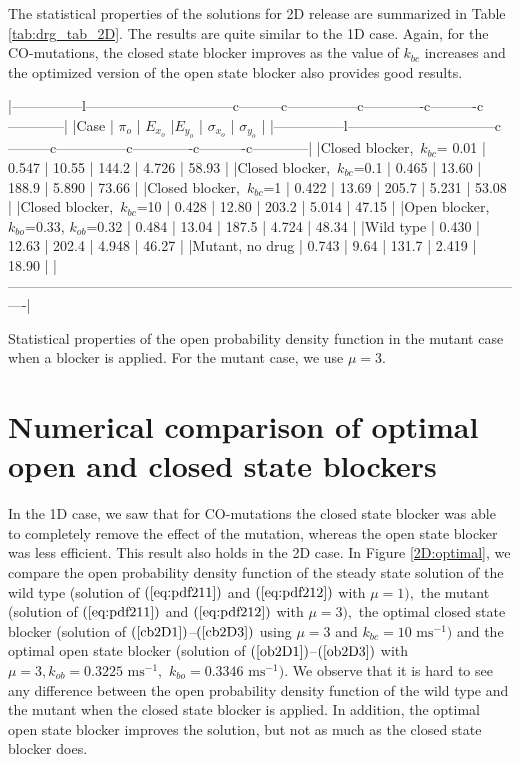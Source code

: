 {The statistical properties of the solutions for 2D release are summarized in Table \ref{tab:drg_tab_2D}. The results are quite similar to the 1D case. Again, for the CO-mutations, the closed state blocker improves as the value of $k_{bc}$ increases and the optimized version of the open state blocker also provides good results.


|---------------l--------------------------------c---------c---------------c-------------c----------c------------|
|Case                                        | $\pi_o$ | $E_{x_o}$ |$E_{y_o}$ | $\sigma_{x_o}$ | $\sigma_{y_o}$  |
|---------------l--------------------------------c---------c---------------c-------------c----------c------------|
|Closed blocker,\ $k_{bc}$= 0.01             | 0.547   | 10.55     | 144.2    | 4.726          |  58.93          |
|Closed blocker,\ $k_{bc}$=0.1               | 0.465   | 13.60     | 188.9    | 5.890          |  73.66          |
|Closed blocker,\ $k_{bc}$=1                 | 0.422   | 13.69     | 205.7    | 5.231          |  53.08          |
|Closed blocker,\ $k_{bc}$=10                | 0.428   | 12.80     | 203.2    | 5.014          |  47.15          |
|Open blocker,\ $k_{bo}$=0.33, $k_{ob}$=0.32 | 0.484   | 13.04     | 187.5    | 4.724          |  48.34          |
|Wild type                                   | 0.430   | 12.63     | 202.4    | 4.948          |  46.27          |
|Mutant, no drug                             | 0.743   | 9.64      | 131.7    | 2.419          |  18.90          |
|----------------------------------------------------------------------------------------------------------------|

Statistical properties of the open probability density function in the mutant case when a blocker is applied.  For the mutant case, we use $\mu=3$.



\section[Numerical comparison of blockers]{Numerical comparison of optimal open and closed state blockers}

In the 1D case, we saw that for CO-mutations the closed state blocker was able 
to completely remove the effect of the mutation, whereas the open state blocker 
was less efficient.
This result also holds in the 2D case. In Figure \ref{2D:optimal}, we compare the open
probability density function of the steady state solution of the wild type
(solution of $(\ref{eq:pdf211})$ and $(\ref{eq:pdf212})$ with $\mu=1),$ the mutant
(solution of $(\ref{eq:pdf211})$ and $(\ref{eq:pdf212})$ with $\mu=3),$ the optimal closed state blocker
(solution of $(\ref{cb2D1})$--$(\ref{cb2D3})$ using $\mu=3$ and $k_{bc}=10\text{ ms}^{-1})$ and the optimal
open state blocker (solution of $(\ref{ob2D1})$--$(\ref{ob2D3})$ with $\mu=3,k_{ob}=0.3225\text{ ms}^{-1},$
$k_{bo}=0.3346\text{ ms}^{-1}).$ We observe that it is hard to see any difference between the open probability
density function of the wild type and the mutant when the closed state blocker is applied. In addition,
the optimal open state blocker improves the solution, but not as much as the closed state blocker does.

}
